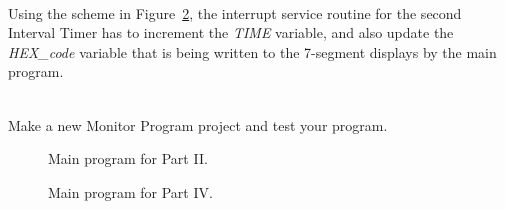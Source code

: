 \documentclass[epsfig,10pt,fullpage]{article}
\newcommand{\CommonDocsPath}{../../../../common/docs}
\begin{document}
~\\
Using the scheme in Figure~\ref{fig:code3}, the interrupt service routine for the second 
Interval Timer has to increment the {\it TIME} variable, and also update
the {\it HEX\_code} variable that is being written to the 7-segment displays by the main program.

~\\
Make a new Monitor Program project and test your program. 
~\\

\begin{figure}[H]
\begin{center}

\end{center}
\caption{Main program for Part II.}
\label{fig:code2}
\end{figure}

\begin{figure}[H]
\begin{center}

\end{center}
\vspace{-0.5cm}\caption{Main program for Part IV.}
\label{fig:code3}
\end{figure}



\end{document}
